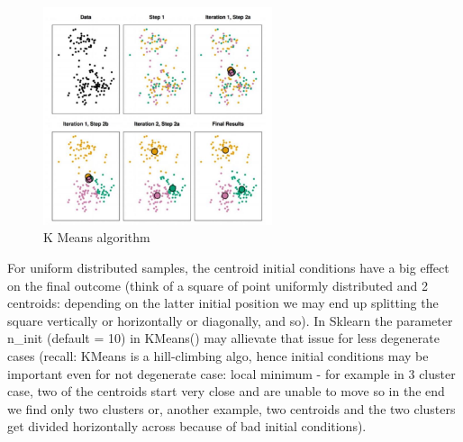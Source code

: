 \documentclass[11pt]{article}
\begin{document}
\begin{figure}[htbp] 
	\centering
	\includegraphics[width=0.6\textwidth]{pics/k_means_algo_loop}
	\caption{K Means algorithm} 
\end{figure}
For uniform distributed samples, the centroid initial conditions have a big effect on the final outcome (think of a square of point uniformly distributed and 2 centroids: depending on the latter initial position we may end up splitting the square vertically or horizontally or diagonally, and so). In Sklearn the parameter n\_init (default = 10) in KMeans() may allievate that issue for less degenerate cases (recall: KMeans is a hill-climbing algo, hence initial conditions may be important even for not degenerate case: local minimum - for example in 3 cluster case, two of the centroids start very close and are unable to move so in the end we find only two clusters or, another example, two centroids and the two clusters get divided horizontally across because of bad initial conditions).
\end{document}
